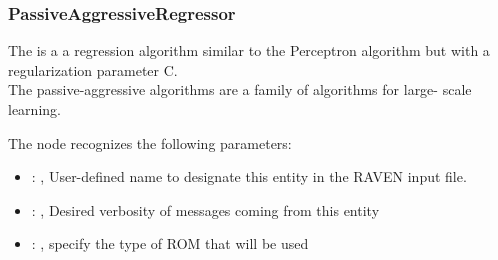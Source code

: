 \subsubsection{PassiveAggressiveRegressor}
  The                          is a a regression algorithm
  similar to the Perceptron algorithm                         but with a regularization parameter C.
  \\The passive-aggressive algorithms are a family of algorithms for                         large-
  scale learning.                         

  The  node recognizes the following parameters:
    \begin{itemize}
      \item {}: ,
        User-defined name to designate this entity in the RAVEN input file.
      \item {}: ,
        Desired verbosity of messages coming from this entity
      \item {}: ,
        specify the type of ROM that will be used
  \end{itemize}


